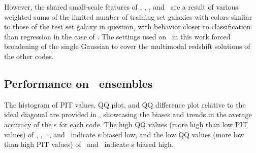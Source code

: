 However, the shared small-scale features of \annz, \metaphor, \cmnn, and \skynet\ are a result of various weighted sums of the limited number of training set galaxies with colors similar to those of the test set galaxy in question, with behavior closer to classification than regression in the case of \annz.
The settings used on \gpz\ in this work forced broadening of the single Gaussian to cover the multimodal redshift solutions of the other codes.

\subsection{Performance on \pzpdf\ ensembles}

The histogram of PIT values, QQ plot, and QQ difference plot relative to the ideal diagonal are provided in , showcasing the biases and trends in the average accuracy of the \pzpdf s for each code.
The high QQ values (more high than low PIT values) of \bpz, \cmnn, \delight, \eazy, and \gpz\ indicate \pzpdf s biased low, and the low QQ values (more low than high PIT values) of \skynet\ and \tpz\ indicate \pzpdf s biased high.

